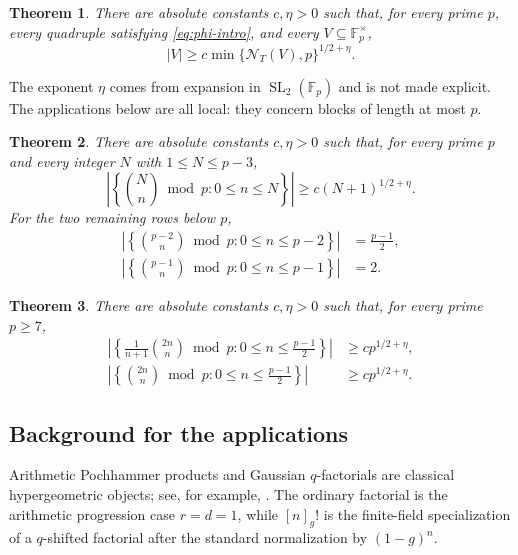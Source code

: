 \documentclass[11pt,reqno]{amsart}
\numberwithin{equation}{section}
\newtheorem{theorem}{Theorem}[section]
\theoremstyle{definition}
\theoremstyle{remark}
\newcommand{\F}{\mathbb F}
\newcommand{\SL}{\operatorname{SL}}
\newcommand{\cN}{\mathcal N}
\begin{document}
\begin{theorem}\label{thm:abstract-intro}
There are absolute constants $c,\eta>0$ such that, for every prime $p$, every quadruple satisfying \eqref{eq:phi-intro}, and every $V\subseteq\F_p^\times$,
\begin{equation}\label{eq:abstract-intro}
  |V|\ge c\min\{\cN_T(V),p\}^{1/2+\eta}.
\end{equation}
\end{theorem}

The exponent $\eta$ comes from expansion in $\SL_2(\F_p)$ and is not made explicit.  The applications below are all local: they concern blocks of length at most $p$.

\begin{theorem}\label{thm:binomial-intro}
There are absolute constants $c,\eta>0$ such that, for every prime $p$ and every integer $N$ with $1\le N\le p-3$,
\begin{equation}\label{eq:binomial-intro}
  \left|\left\{\binom Nn\bmod p:0\le n\le N\right\}\right|
  \ge c(N+1)^{1/2+\eta}.
\end{equation}
For the two remaining rows below $p$,
\begin{align}
  \left|\left\{\binom{p-2}{n}\bmod p:0\le n\le p-2\right\}\right|
  &=\frac{p-1}{2},\label{eq:pminus2-intro}\\
  \left|\left\{\binom{p-1}{n}\bmod p:0\le n\le p-1\right\}\right|
  &=2.\label{eq:pminus1-intro}
\end{align}
\end{theorem}

\begin{theorem}\label{thm:catalan-intro}
There are absolute constants $c,\eta>0$ such that, for every prime $p\ge7$,
\begin{align}
  \left|\left\{\frac1{n+1}\binom{2n}{n}\bmod p:
  0\le n\le\frac{p-1}{2}\right\}\right|
  &\ge cp^{1/2+\eta},\label{eq:catalan-intro}\\
  \left|\left\{\binom{2n}{n}\bmod p:
  0\le n\le\frac{p-1}{2}\right\}\right|
  &\ge cp^{1/2+\eta}.\label{eq:central-intro}
\end{align}
\end{theorem}

\subsection{Background for the applications}

Arithmetic Pochhammer products and Gaussian $q$-factorials are classical hypergeometric objects; see, for example, \cite{GasperRahman2004}.  The ordinary factorial is the arithmetic progression case $r=d=1$, while $[n]_g!$ is the finite-field specialization of a $q$-shifted factorial after the standard normalization by $(1-g)^n$.
\end{document}
